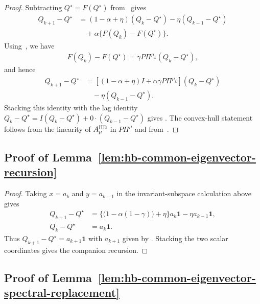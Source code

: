 \documentclass[letterpaper]{article}
\numberwithin{equation}{section}
\begin{document}
\begin{proof}
Subtracting $Q^\star=F(Q^\star)$ from~ gives
\begin{align*}
Q_{k+1}-Q^\star
  &=(1-\alpha+\eta)(Q_k-Q^\star)
    -\eta(Q_{k-1}-Q^\star)\\
  &\quad+\alpha\{F(Q_k)-F(Q^\star)\}.
\end{align*}
Using~, we have
\begin{align*}
  F(Q_k)-F(Q^\star)=\gamma P\Pi^{\mu_k}(Q_k-Q^\star),
\end{align*}
and hence
\begin{align*}
Q_{k+1}-Q^\star
  &=\left[(1-\alpha+\eta)I+\alpha\gamma P\Pi^{\mu_k}\right]
    (Q_k-Q^\star)\\
  &\quad-\eta(Q_{k-1}-Q^\star).
\end{align*}
Stacking this identity with the lag identity
$Q_k-Q^\star=I(Q_k-Q^\star)+0\cdot(Q_{k-1}-Q^\star)$ gives
. The convex-hull statement follows from the linearity of
$A_\mu^{\rm HB}$ in $P\Pi^\mu$ and from~.
\end{proof}

\subsection{Proof of Lemma~\ref{lem:hb-common-eigenvector-recursion}}
\label{app:proof-lem-hb-common-eigenvector-recursion}

\begin{proof}
Taking $x=a_k$ and $y=a_{k-1}$ in the invariant-subspace calculation above gives
\begin{align*}
  Q_{k+1}-Q^\star
  &=\{\bigl(1-\alpha(1-\gamma)\bigr)+\eta\}a_k\mathbf{1}
    -\eta a_{k-1}\mathbf{1},\\
  Q_k-Q^\star&=a_k\mathbf{1}.
\end{align*}
Thus $Q_{k+1}-Q^\star=a_{k+1}\mathbf{1}$ with $a_{k+1}$ given by
. Stacking the two scalar coordinates gives the companion recursion.
\end{proof}

\subsection{Proof of Lemma~\ref{lem:hb-common-eigenvector-spectral-replacement}}
\label{app:proof-lem-hb-common-eigenvector-spectral-replacement}
\end{document}
